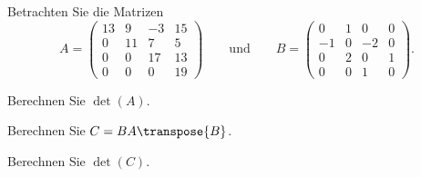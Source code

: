 Betrachten Sie die Matrizen
\[
A=\begin{pmatrix}
13& 9&-3&15\\
 0&11& 7& 5\\
 0& 0&17&13\\
 0& 0& 0&19
\end{pmatrix}
\qquad\text{und}\qquad
B
=
\begin{pmatrix}
   0&  1&  0&  0\\
  -1&  0& -2&  0\\
   0&  2&  0&  1\\
   0&  0&  1&  0
\end{pmatrix}.
\]
\begin{teilaufgaben}
\item Berechnen Sie $\det(A)$.
\item Berechnen Sie $C=BA\transpose{B}$.
\item Berechnen Sie $\det(C)$.
\end{teilaufgaben}


